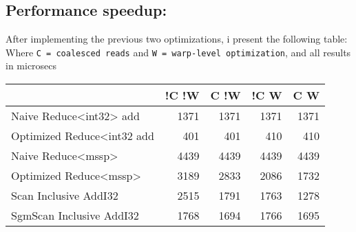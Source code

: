 \documentclass[11pt]{article}
\begin{document}
\subsection{Performance speedup:}
\label{sec:org0a7ddb3}
After implementing the previous two optimizations, i present the following table:  
Where \texttt{C = coalesced reads} and \texttt{W = warp-level optimization}, and all results in microsecs
\begin{center}
\begin{tabular}{lrrrr}
 & !C !W & C !W & !C W & C W\\
\hline
Naive Reduce<int32> add & 1371 & 1371 & 1371 & 1371\\
Optimized Reduce<int32 add & 401 & 401 & 410 & 410\\
Naive Reduce<mssp> & 4439 & 4439 & 4439 & 4439\\
Optimized Reduce<mssp> & 3189 & 2833 & 2086 & 1732\\
Scan Inclusive AddI32 & 2515 & 1791 & 1763 & 1278\\
SgmScan Inclusive AddI32 & 1768 & 1694 & 1766 & 1695\\
\end{tabular}
\end{center}
\end{document}
